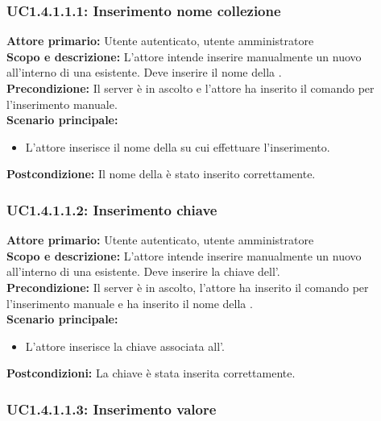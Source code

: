 \documentclass{scalatekids-article}
\begin{document}
\subsubsection{UC1.4.1.1.1: Inserimento nome collezione}

\textbf{Attore primario:} Utente autenticato, utente amministratore\\
\textbf{Scopo e descrizione:} L'attore intende inserire manualmente un nuovo  all'interno di una  esistente. Deve inserire il nome della .\\
\textbf{Precondizione:} Il server è in ascolto e l'attore ha inserito il comando per l'inserimento  manuale.\\
\textbf{Scenario principale:}
\begin{itemize}
\item L'attore inserisce il nome della  su cui effettuare l'inserimento.
\end{itemize}
\textbf{Postcondizione:} Il nome della  è stato inserito correttamente.

\subsubsection{UC1.4.1.1.2: Inserimento chiave}

\textbf{Attore primario:} Utente autenticato, utente amministratore\\
\textbf{Scopo e descrizione:} L'attore intende inserire manualmente un nuovo  all'interno di una  esistente. Deve inserire la chiave dell'.\\
\textbf{Precondizione:} Il server è in ascolto, l'attore ha inserito il comando per l'inserimento  manuale e ha inserito il nome della .\\
\textbf{Scenario principale:}
\begin{itemize}
\item L'attore inserisce la chiave associata all'.
\end{itemize}
\textbf{Postcondizioni:} La chiave è stata inserita correttamente.

\subsubsection{UC1.4.1.1.3: Inserimento valore}
\end{document}

